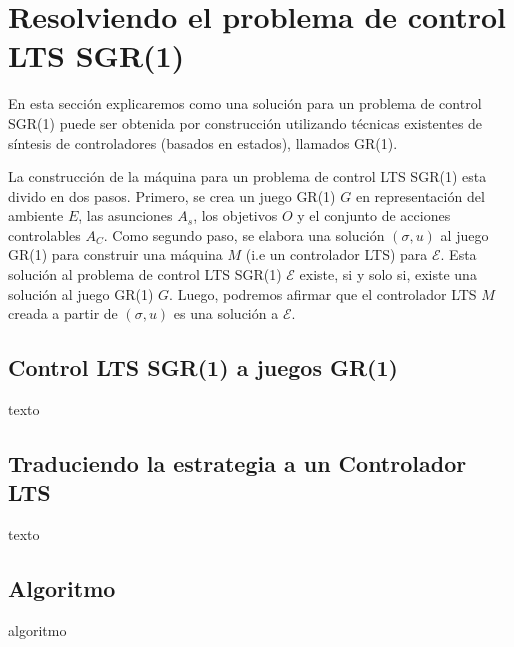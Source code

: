 \section{Resolviendo el problema de control LTS SGR(1)}

En esta sección explicaremos como una solución para un problema de control SGR(1) puede ser obtenida por construcción
utilizando técnicas existentes de síntesis de controladores (basados en estados), llamados GR(1). \cite{Piterman}

La construcción de la máquina para un problema de control LTS SGR(1) esta divido en dos pasos. Primero, se crea un juego GR(1)
$G$ en representación del ambiente $E$, las asunciones $A_s$, los objetivos $O$ y el conjunto de acciones controlables
$A_C$. Como segundo paso, se elabora una solución $(\sigma,u)$ al juego GR(1) para construir una máquina $M$ (i.e un
controlador LTS) para $\mathcal{E}$. Esta solución al problema de control LTS SGR(1) $\mathcal{E}$ existe, si y solo si,
existe una solución al juego GR(1) $G$. Luego, podremos afirmar que el controlador LTS $M$ creada a partir de
$(\sigma,u)$ es una solución a $\mathcal{E}$.

\subsection{Control LTS SGR(1) a juegos GR(1)}

texto

\subsection{Traduciendo la estrategia a un Controlador LTS}

texto

\subsection{Algoritmo}

algoritmo
